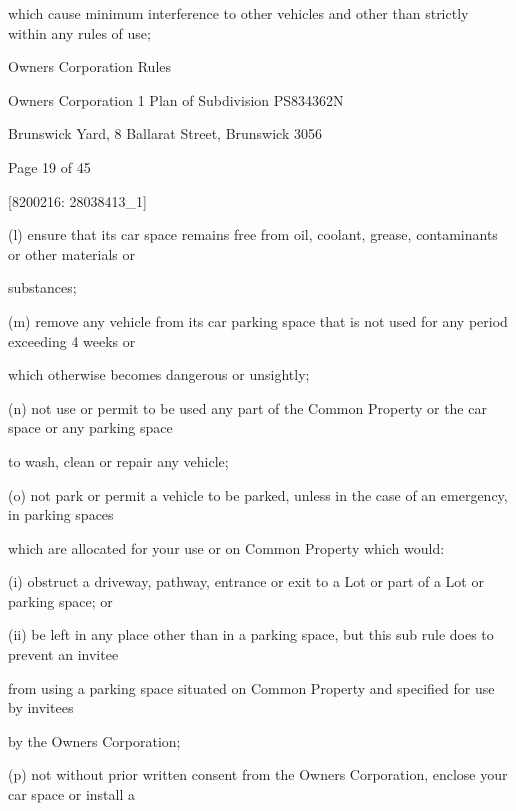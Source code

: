 \documentclass{article}
\begin{document}
{\fontsize{10.02}{1}which cause minimum interference to other vehicles and other than strictly within any rules of use; }

\newpage





{\fontsize{9}{1}Owners Corporation Rules }

{\fontsize{9}{1}Owners Corporation 1 Plan of Subdivision PS834362N }

{\fontsize{9}{1}Brunswick Yard, 8 Ballarat Street, Brunswick 3056 }


{\fontsize{9}{1}Page 19  of 45 }



{\fontsize{7.02}{1}[8200216: 28038413\_1] }


{\fontsize{9.962}{1}(l) ensure that its car space remains free from oil, coolant, grease, contaminants or other materials or }

{\fontsize{10.02}{1}substances; }

{\fontsize{9.962}{1}(m) remove any vehicle from its car parking space that is not used for any period exceeding 4 weeks or }

{\fontsize{10.02}{1}which otherwise becomes dangerous or unsightly; }

{\fontsize{9.962}{1}(n) not use or permit to be used any part of the Common Property or the car space or any parking space }

{\fontsize{10.02}{1}to wash, clean or repair any vehicle; }

{\fontsize{9.962}{1}(o) not park or permit a vehicle to be parked, unless in the case of an emergency, in parking spaces }

{\fontsize{10.02}{1}which are allocated for your use or on Common Property which would: }

{\fontsize{9.962}{1}(i) obstruct a driveway, pathway, entrance or exit to a Lot or part of a Lot or parking space; or }

{\fontsize{9.962}{1}(ii) be left in any place other than in a parking space, but this sub rule does to prevent an invitee }

{\fontsize{10.02}{1}from using a parking space situated on Common Property and specified for use by invitees }

{\fontsize{10.02}{1}by the Owners Corporation; }

{\fontsize{9.962}{1}(p) not without prior written consent from the Owners Corporation, enclose your car space or install a }
\end{document}
